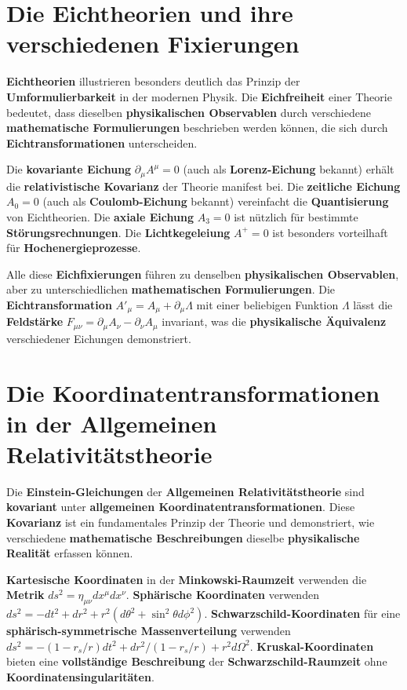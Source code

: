 \documentclass[12pt,a4paper]{report}
\begin{document}
	\section{Die Eichtheorien und ihre verschiedenen Fixierungen}
	
	\textbf{Eichtheorien} illustrieren besonders deutlich das Prinzip der \textbf{Umformulierbarkeit} in der modernen Physik. Die \textbf{Eichfreiheit} einer Theorie bedeutet, dass dieselben \textbf{physikalischen Observablen} durch verschiedene \textbf{mathematische Formulierungen} beschrieben werden können, die sich durch \textbf{Eichtransformationen} unterscheiden.
	
	Die \textbf{kovariante Eichung} $\partial_\mu A^\mu = 0$ (auch als \textbf{Lorenz-Eichung} bekannt) erhält die \textbf{relativistische Kovarianz} der Theorie manifest bei. Die \textbf{zeitliche Eichung} $A_0 = 0$ (auch als \textbf{Coulomb-Eichung} bekannt) vereinfacht die \textbf{Quantisierung} von Eichtheorien. Die \textbf{axiale Eichung} $A_3 = 0$ ist nützlich für bestimmte \textbf{Störungsrechnungen}. Die \textbf{Lichtkegeleiung} $A^+ = 0$ ist besonders vorteilhaft für \textbf{Hochenergieprozesse}.
	
	Alle diese \textbf{Eichfixierungen} führen zu denselben \textbf{physikalischen Observablen}, aber zu unterschiedlichen \textbf{mathematischen Formulierungen}. Die \textbf{Eichtransformation} $A'_\mu = A_\mu + \partial_\mu \Lambda$ mit einer beliebigen Funktion $\Lambda$ lässt die \textbf{Feldstärke} $F_{\mu\nu} = \partial_\mu A_\nu - \partial_\nu A_\mu$ invariant, was die \textbf{physikalische Äquivalenz} verschiedener Eichungen demonstriert.
	
	\section{Die Koordinatentransformationen in der Allgemeinen Relativitätstheorie}
	
	Die \textbf{Einstein-Gleichungen} der \textbf{Allgemeinen Relativitätstheorie} sind \textbf{kovariant} unter \textbf{allgemeinen Koordinatentransformationen}. Diese \textbf{Kovarianz} ist ein fundamentales Prinzip der Theorie und demonstriert, wie verschiedene \textbf{mathematische Beschreibungen} dieselbe \textbf{physikalische Realität} erfassen können.
	
	\textbf{Kartesische Koordinaten} in der \textbf{Minkowski-Raumzeit} verwenden die \textbf{Metrik} $ds^2 = \eta_{\mu\nu}dx^\mu dx^\nu$. \textbf{Sphärische Koordinaten} verwenden $ds^2 = -dt^2 + dr^2 + r^2(d\theta^2 + \sin^2\theta d\phi^2)$. \textbf{Schwarzschild-Koordinaten} für eine \textbf{sphärisch-symmetrische Massenverteilung} verwenden $ds^2 = -(1-r_s/r)dt^2 + dr^2/(1-r_s/r) + r^2d\Omega^2$. \textbf{Kruskal-Koordinaten} bieten eine \textbf{vollständige Beschreibung} der \textbf{Schwarzschild-Raumzeit} ohne \textbf{Koordinatensingularitäten}.
	
\end{document}

